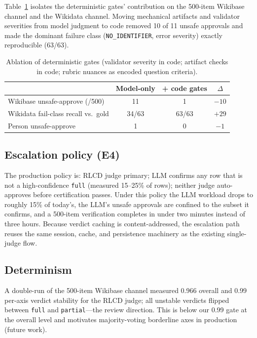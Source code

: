 \documentclass{llncs}
\begin{document}
Table~\ref{tab:ablation} isolates the deterministic gates' contribution on
the 500-item Wikibase channel and the Wikidata channel. Moving mechanical
artifacts and validator severities from model judgment to code removed
10 of 11 unsafe approvals and made the dominant failure class
(\texttt{NO\_IDENTIFIER}, error severity) exactly reproducible (63/63).

\begin{table}[t]
\centering
\small
\begin{tabular}{lccc}
\toprule
 & Model-only & + code gates & $\Delta$ \\
\midrule
Wikibase unsafe-approve (/500) & 11 & 1 & $-10$ \\
Wikidata fail-class recall vs.\ gold & 34/63 & 63/63 & $+29$ \\
Person unsafe-approve & 1 & 0 & $-1$ \\
\bottomrule
\end{tabular}
\caption{Ablation of deterministic gates (validator severity in code;
artifact checks in code; rubric nuances as encoded question criteria).}
\label{tab:ablation}
\end{table}

\subsection{Escalation policy (E4)}
\label{sec:eval:e4}

The production policy is: RLCD judge primary; LLM confirms any row that is
not a high-confidence \texttt{full} (measured 15--25\% of rows); neither
judge auto-approves before certification passes. Under this policy the LLM
workload drops to roughly 15\% of today's, the LLM's unsafe approvals are
confined to the subset it confirms, and a 500-item verification completes
in under two minutes instead of three hours. Because verdict caching is
content-addressed, the escalation path reuses the same session, cache, and
persistence machinery as the existing single-judge flow.

\subsection{Determinism}

A double-run of the 500-item Wikibase channel measured 0.966 overall and
0.99 per-axis verdict stability for the RLCD judge; all unstable verdicts
flipped between \texttt{full} and \texttt{partial}---the review direction.
This is below our 0.99 gate at the overall level and motivates
majority-voting borderline axes in production (future work).
\end{document}
